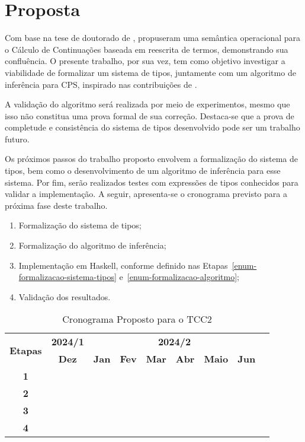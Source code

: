 \chapter{Proposta}\label{ch:proposta}

Com base na tese de doutorado de ,  propuseram uma semântica operacional para o Cálculo de Continuações baseada em reescrita de termos, demonstrando sua confluência.
O presente trabalho, por sua vez, tem como objetivo investigar a viabilidade de formalizar um sistema de tipos, juntamente com um algoritmo de inferência para CPS, inspirado nas contribuições de .

A validação do algoritmo será realizada por meio de experimentos, mesmo que isso não constitua uma prova formal de sua correção.
Destaca-se que a prova de completude e consistência do sistema de tipos desenvolvido pode ser um trabalho futuro.

Os próximos passos do trabalho proposto envolvem a formalização do sistema de tipos, bem como o desenvolvimento de um algoritmo de inferência para esse sistema.
Por fim, serão realizados testes com expressões de tipos conhecidos para validar a implementação.
A seguir, apresenta-se o cronograma previsto para a próxima fase deste trabalho.

\begin{enumerate}
	\item Formalização do sistema de tipos;\label{enum-formalizacao-sistema-tipos}
	\item Formalização do algoritmo de inferência;\label{enum-formalizacao-algoritmo}
	\item Implementação em Haskell, conforme definido nas Etapas~\ref{enum-formalizacao-sistema-tipos} e~\ref{enum-formalizacao-algoritmo};
	\item Validação dos resultados.
\end{enumerate}

\begin{table}[htbp]
	\centering
	\begin{tabular}{|c|c|c|c|c|c|c|c|c|}
		\hline
		\multirow{2}{*}{\textbf{\small{Etapas}}} & \textbf{\small{2024/1}} & \multicolumn{6}{c|}{\textbf{\small{2024/2}}} \\
		\cline{2-8}
		& \textbf{Dez} & \textbf{Jan} & \textbf{Fev} & \textbf{Mar} & \textbf{Abr} & \textbf{Maio} & \textbf{Jun} \\
		\hline
		\textbf{\small{1}}  & \cellcolor{gray} & \cellcolor{gray} & \cellcolor{gray} &  &  &  & \\
		\hline
		\textbf{\small{2}}  &  &  & \cellcolor{gray} & \cellcolor{gray} &  &  & \\
		\hline
		\textbf{\small{3}}  &  &  &  & \cellcolor{gray} & \cellcolor{gray} & \cellcolor{gray} & \\
		\hline
		\textbf{\small{4}}  &  &  &  &  &  & \cellcolor{gray} & \cellcolor{gray}\\
		\hline
	\end{tabular}
	\caption{Cronograma Proposto para o TCC2}
\end{table}
% 
% 
% 
